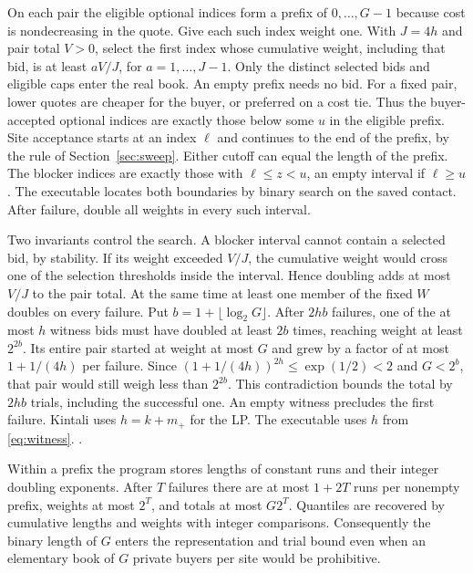 \documentclass[11pt,letterpaper]{article}
\newcommand{\code}[1]{\textnormal{\texttt{\detokenize{#1}}}}
\newcommand{\baseurl}{https://github.com/robbiemu/bayesian-simple-security-games/blob/75bc25c2ddfac1813064434a3165b3ddd1a1f63d}
\newcommand{\decl}[3]{\href{\baseurl/lean/#1.lean\#L#2}{\code{#3}}}
\begin{document}
On each pair the eligible optional indices form a prefix of
$0,\ldots,G-1$ because cost is nondecreasing in the quote. Give each such
index weight one. With $J=4h$ and pair total $V>0$, select the first index
whose cumulative weight, including that bid, is at least $aV/J$, for
$a=1,\ldots,J-1$. Only the distinct selected bids and eligible caps enter
the real book. An empty prefix needs no bid. For a fixed pair, lower quotes
are cheaper for the buyer, or preferred on a cost tie. Thus the
buyer-accepted optional indices are exactly those below some $u$ in the
eligible prefix. Site acceptance starts at an index $\ell$ and continues
to the end of the prefix, by the rule of Section~\ref{sec:sweep}. Either
cutoff can equal the length of the prefix. The blocker indices are
exactly those with $\ell\le z<u$, an empty interval if $\ell\ge u$.
The executable locates both boundaries by binary search on the saved contact.
After failure, double all weights in every such interval.
\cite[\S3, pp.~8--9]{kintali}

Two invariants control the search. A blocker interval cannot contain a
selected bid, by stability. If its weight exceeded $V/J$, the cumulative
weight would cross one of the selection thresholds inside the interval.
Hence doubling adds at most $V/J$ to the pair total. At the same time at
least one member of the fixed $W$ doubles on every failure. Put
$b=1+\lfloor\log_2 G\rfloor$. After $2hb$ failures, one of the at most
$h$ witness bids must have doubled at least $2b$ times, reaching weight
at least $2^{2b}$. Its entire pair started at weight at most $G$ and
grew by a factor of at most $1+1/(4h)$ per failure. Since
$(1+1/(4h))^{2h}\le\exp(1/2)<2$ and $G<2^b$, that pair would still
weigh less than $2^{2b}$. This contradiction bounds the total by $2hb$
trials, including the successful one. An empty witness precludes the
first failure. Kintali uses $h=k+m_+$ for the LP. The executable uses
$h$ from \eqref{eq:witness}.
\cite[\S3]{kintali} \decl{Kintali/QuoteSearch/Algorithm}{167}{QuoteSearch.solve_correct}.

Within a prefix the program stores lengths of constant runs and their
integer doubling exponents. After $T$ failures there are at most $1+2T$
runs per nonempty prefix, weights at most $2^T$, and totals at most
$G2^T$. Quantiles are recovered by cumulative lengths and weights with
integer comparisons. Consequently the binary length of $G$ enters the
representation and trial bound even when an elementary book of $G$ private
buyers per site would be prohibitive.
\end{document}
